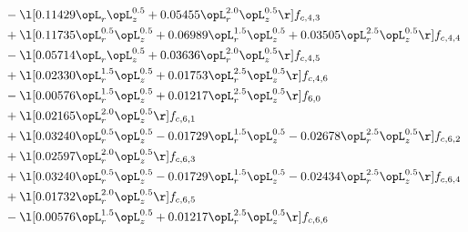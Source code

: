 \begin{alignat}{2}
& - \l[  0.11429 \opL_r \opL_z^{0.5} +  0.05455 \opL_r^{2.0} \opL_z^{0.5}  \r] f_{c,4,3} \nonumber \\ 
& + \l[  0.11735 \opL_r^{0.5} \opL_z^{0.5} +  0.06989 \opL_r^{1.5} \opL_z^{0.5} +  0.03505 \opL_r^{2.5} \opL_z^{0.5}  \r] f_{c,4,4} \nonumber \\ 
& - \l[  0.05714 \opL_r \opL_z^{0.5} +  0.03636 \opL_r^{2.0} \opL_z^{0.5}  \r] f_{c,4,5} \nonumber \\ 
& + \l[  0.02330 \opL_r^{1.5} \opL_z^{0.5} +  0.01753 \opL_r^{2.5} \opL_z^{0.5}  \r] f_{c,4,6} \nonumber \\ 
& - \l[  0.00576 \opL_r^{1.5} \opL_z^{0.5} +  0.01217 \opL_r^{2.5} \opL_z^{0.5}  \r] f_{6,0} \nonumber \\ 
& + \l[  0.02165 \opL_r^{2.0} \opL_z^{0.5}  \r] f_{c,6,1} \nonumber \\ 
& + \l[  0.03240 \opL_r^{0.5} \opL_z^{0.5}   -0.01729 \opL_r^{1.5} \opL_z^{0.5}   -0.02678 \opL_r^{2.5} \opL_z^{0.5}  \r] f_{c,6,2} \nonumber \\ 
& + \l[  0.02597 \opL_r^{2.0} \opL_z^{0.5}  \r] f_{c,6,3} \nonumber \\ 
& + \l[  0.03240 \opL_r^{0.5} \opL_z^{0.5}   -0.01729 \opL_r^{1.5} \opL_z^{0.5}   -0.02434 \opL_r^{2.5} \opL_z^{0.5}  \r] f_{c,6,4} \nonumber \\ 
& + \l[  0.01732 \opL_r^{2.0} \opL_z^{0.5}  \r] f_{c,6,5} \nonumber \\ 
& - \l[  0.00576 \opL_r^{1.5} \opL_z^{0.5} +  0.01217 \opL_r^{2.5} \opL_z^{0.5}  \r] f_{c,6,6} \nonumber \\ 
\end{alignat} 


